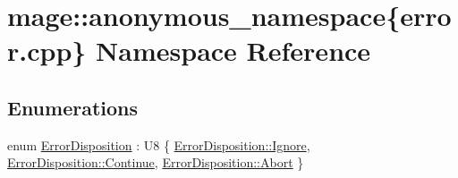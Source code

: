 \hypertarget{namespacemage_1_1anonymous__namespace_02error_8cpp_03}{}\section{mage\+:\+:anonymous\+\_\+namespace\{error.\+cpp\} Namespace Reference}
\label{namespacemage_1_1anonymous__namespace_02error_8cpp_03}
\subsection*{Enumerations}
\begin{DoxyCompactItemize}
\item 
enum \mbox{\hyperlink{namespacemage_1_1anonymous__namespace_02error_8cpp_03_a02d701a32d4f84856df21925fcce5500}{Error\+Disposition}} \+: U8 \{ \mbox{\hyperlink{namespacemage_1_1anonymous__namespace_02error_8cpp_03_a02d701a32d4f84856df21925fcce5500afd038fc7f319e48f3115d92bf5bdbef9}{Error\+Disposition\+::\+Ignore}}, 
\mbox{\hyperlink{namespacemage_1_1anonymous__namespace_02error_8cpp_03_a02d701a32d4f84856df21925fcce5500aa0bfb8e59e6c13fc8d990781f77694fe}{Error\+Disposition\+::\+Continue}}, 
\mbox{\hyperlink{namespacemage_1_1anonymous__namespace_02error_8cpp_03_a02d701a32d4f84856df21925fcce5500a727b63583e01fa2b3952dab580c84dc2}{Error\+Disposition\+::\+Abort}}
 \}
\end{DoxyCompactItemize}
